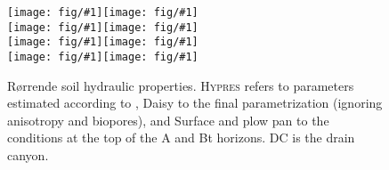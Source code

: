 \documentclass[a4paper]{article}
\newcommand{\figl}{\hspace*{-2cm}}
\newcommand{\figright}[1]{\texttt{[image: fig/\#1]}}
\newcommand{\fig}[1]{\figl\figright{#1}}
\newcommand{\Hypres}{\textsc{Hypres}}
\begin{document}
\begin{figure}[htbp] 
  \fig{Rorrende-Ap-Theta}\figright{Rorrende-Ap-K}\\
  \fig{Rorrende-Bt-Theta}\figright{Rorrende-Bt-K}\\
  \fig{Rorrende-C-Theta}\figright{Rorrende-C-K}\\
  \fig{Rorrende-DC-Theta}\figright{Rorrende-DC-K}
  \caption{R{\o}rrende soil hydraulic properties.  \Hypres{} refers to
    parameters estimated according to \citet{hypres}, Daisy to the
    final parametrization (ignoring anisotropy and biopores), and
    Surface and plow pan to the conditions at the top of the A and Bt
    horizons.  DC is the drain canyon.}
  \label{fig:Rorrende-hor}
\end{figure}

\pagestyle{empty}

\end{document}
